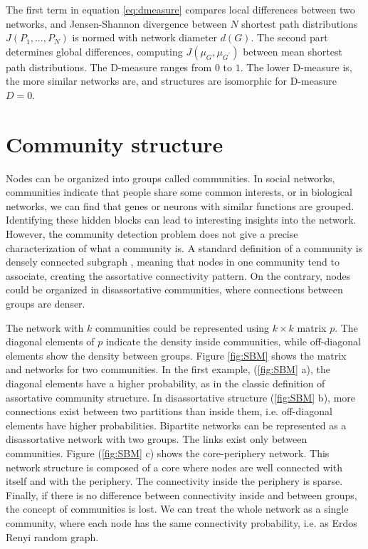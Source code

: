 The first term in equation \ref{eq:dmeasure} compares local differences between two networks, and Jensen-Shannon divergence between $N$ shortest path distributions $J(P_{1},..., P_{N})$ is normed with network diameter $d(G)$. The second part determines global differences, computing  ${J(\mu_{G},\mu_{G^{'}})}$ between mean shortest path distributions. The D-measure ranges from $0$ to $1$. The lower D-measure is, the more similar networks are, and structures are isomorphic for D-measure $D = 0$.

\newpage

\section{Community structure}

Nodes can be organized into groups called communities. In social networks, communities indicate that people share some common interests, or in biological networks, we can find that genes or neurons with similar functions are grouped. Identifying these hidden blocks can lead to interesting insights into the network. However, the community detection problem does not give a precise characterization of what a community is. A standard definition of a community is densely connected subgraph \cite{fortunato2010community, martin}, meaning that nodes in one community tend to associate, creating the assortative connectivity pattern. On the contrary, nodes could be organized in disassortative communities, where connections between groups are denser. 

The network with $k$ communities could be represented using $k \times k$ matrix $p$. The diagonal elements of $p$ indicate the density inside communities, while off-diagonal elements show the density between groups. Figure \ref{fig:SBM} \cite{fortunato2010community} shows the matrix and networks for two communities. In the first example, (\ref{fig:SBM} a), the diagonal elements have a higher probability, as in the classic definition of assortative community structure. In disassortative structure (\ref{fig:SBM} b), more connections exist between two partitions than inside them, i.e. off-diagonal elements have higher probabilities. Bipartite networks can be represented as a disassortative network with two groups. The links exist only between communities. Figure (\ref{fig:SBM} c) shows the core-periphery network. This network structure is composed of a core where nodes are well connected with itself and with the periphery. The connectivity inside the periphery is sparse. Finally, if there is no difference between connectivity inside and between groups, the concept of communities is lost. We can treat the whole network as a single community, where each node has the same connectivity probability, i.e. as Erdos Renyi random graph. 

